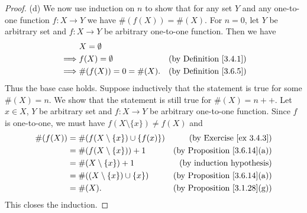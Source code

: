 \begin{proof}{(d)}
    We now use induction on \(n\) to show that for any set \(Y\) and any one-to-one function \(f : X \to Y\) we have \(\#(f(X)) = \#(X)\).
    For \(n = 0\), let \(Y\) be arbitrary set and \(f : X \to Y\) be arbitrary one-to-one function.
    Then we have
    \begin{align*}
                 & X = \emptyset                                              \\
        \implies & f(X) = \emptyset      & \text{(by Definition \ref{3.4.1})} \\
        \implies & \#(f(X)) = 0 = \#(X). & \text{(by Definition \ref{3.6.5})}
    \end{align*}
    Thus the base case holds.
    Suppose inductively that the statement is true for some \(\#(X) = n\).
    We show that the statement is still true for \(\#(X) = n++\).
    Let \(x \in X\), \(Y\) be arbitrary set and \(f : X \to Y\) be arbitrary one-to-one function.
    Since \(f\) is one-to-one, we must have \(f(X \setminus \{x\}) \neq f(X)\) and
    \begin{align*}
        \#(f(X)) & = \#(f(X \setminus \{x\}) \cup \{f(x)\}) & \text{(by Exercise \ref{ex 3.4.3})}     \\
                 & = \#(f(X \setminus \{x\})) + 1           & \text{(by Proposition \ref{3.6.14}(a))} \\
                 & = \#(X \setminus \{x\}) + 1              & \text{(by induction hypothesis)}        \\
                 & = \#((X \setminus \{x\}) \cup \{x\})     & \text{(by Proposition \ref{3.6.14}(a))} \\
                 & = \#(X).                                 & \text{(by Proposition \ref{3.1.28}(g))}
    \end{align*}
    This closes the induction.
\end{proof}

